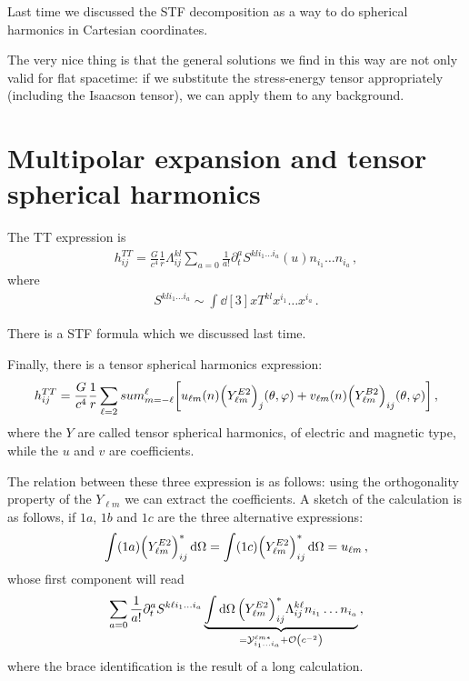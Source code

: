 \documentclass[main.tex]{subfiles}
\begin{document}

Last time we discussed the STF decomposition as a way to do spherical harmonics in Cartesian coordinates. 

The very nice thing is that the general solutions we find in this way are not only valid for flat spacetime: if we substitute the stress-energy tensor appropriately (including the Isaacson tensor), we can apply them to any background. 

\section{Multipolar expansion and tensor spherical harmonics}

The TT expression is 
%
\begin{align}
h_{ij}^{TT} = \frac{G}{c^{4}} \frac{1}{r} \Lambda_{ij}^{kl} \sum _{a=0} \frac{1}{a!} \partial_{t}^{a} S^{kl i_1 \dots i_a} (u) n_{i_1 } \dots n_{i_a}
\,,
\end{align}
%
where 
%
\begin{align}
S^{kl i_1 \dots i_a} \sim \int \dd[3]{x} T^{kl} x^{i_1 } \dots x^{i_a}
\,.
\end{align}

There is a STF formula which we discussed last time. 

Finally, there is a tensor spherical harmonics expression: 
%
\begin{align}
h_{ij}^{TT} = \frac{G}{c^{4}} \frac{1}{r} \sum _{\ell=2} sum_{m= - \ell}^{\ell} \qty[
    u_{\ell m} (n) \qty(Y^{E2}_{\ell m})_j (\theta , \varphi )
    + 
    v_{\ell m} (n) \qty( Y^{B2}_{\ell m})_{ij} (\theta , \varphi )
]
\,,
\end{align}
%
where the \(Y\) are called tensor spherical harmonics, of electric and magnetic type, while the \(u\) and \(v\) are coefficients. 

The relation between these three expression is as follows: using the orthogonality property of the \(Y_{\ell m}\) we can extract the coefficients. 
A sketch of the calculation is as follows, if \(1a\), \(1b\) and \(1c\) are the three alternative expressions: 
%
\begin{align}
\int (1a) \qty(Y^{E2}_{\ell m})_{ij}^{*} \dd{\Omega } = 
\int (1c) \qty(Y^{E2}_{\ell m})_{ij}^{*} \dd{\Omega } = u_{\ell m}
\,,
\end{align}
%
whose first component will read 
%
\begin{align}
\sum _{a=0} \frac{1}{a!} \partial^{a}_{t} S^{k \ell i_1 \dots i_a} 
\underbrace{\int \dd{\Omega } \qty(Y^{E2}_{\ell m})^{*}_{ij} \Lambda_{ij}^{k \ell} n_{i_1 } \dots n_{i_a}}_{= \mathcal{Y}_{i_1 \dots i_a}^{\ell m *} + \order{c^{-2}}}
\,,
\end{align}
%
where the brace identification is the result of a long calculation. 
\end{document}
